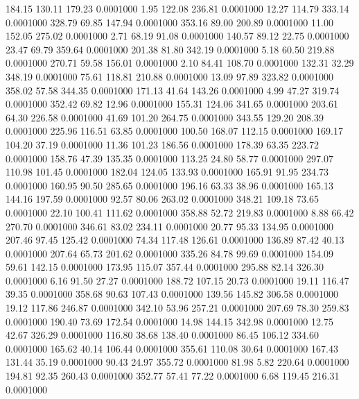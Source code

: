  184.15  130.11  179.23   0.0001000
   1.95  122.08  236.81   0.0001000
  12.27  114.79  333.14   0.0001000
 328.79   69.85  147.94   0.0001000
 353.16   89.00  200.89   0.0001000
  11.00  152.05  275.02   0.0001000
   2.71   68.19   91.08   0.0001000
 140.57   89.12   22.75   0.0001000
  23.47   69.79  359.64   0.0001000
 201.38   81.80  342.19   0.0001000
   5.18   60.50  219.88   0.0001000
 270.71   59.58  156.01   0.0001000
   2.10   84.41  108.70   0.0001000
 132.31   32.29  348.19   0.0001000
  75.61  118.81  210.88   0.0001000
  13.09   97.89  323.82   0.0001000
 358.02   57.58  344.35   0.0001000
 171.13   41.64  143.26   0.0001000
   4.99   47.27  319.74   0.0001000
 352.42   69.82   12.96   0.0001000
 155.31  124.06  341.65   0.0001000
 203.61   64.30  226.58   0.0001000
  41.69  101.20  264.75   0.0001000
 343.55  129.20  208.39   0.0001000
 225.96  116.51   63.85   0.0001000
 100.50  168.07  112.15   0.0001000
 169.17  104.20   37.19   0.0001000
  11.36  101.23  186.56   0.0001000
 178.39   63.35  223.72   0.0001000
 158.76   47.39  135.35   0.0001000
 113.25   24.80   58.77   0.0001000
 297.07  110.98  101.45   0.0001000
 182.04  124.05  133.93   0.0001000
 165.91   91.95  234.73   0.0001000
 160.95   90.50  285.65   0.0001000
 196.16   63.33   38.96   0.0001000
 165.13  144.16  197.59   0.0001000
  92.57   80.06  263.02   0.0001000
 348.21  109.18   73.65   0.0001000
  22.10  100.41  111.62   0.0001000
 358.88   52.72  219.83   0.0001000
   8.88   66.42  270.70   0.0001000
 346.61   83.02  234.11   0.0001000
  20.77   95.33  134.95   0.0001000
 207.46   97.45  125.42   0.0001000
  74.34  117.48  126.61   0.0001000
 136.89   87.42   40.13   0.0001000
 207.64   65.73  201.62   0.0001000
 335.26   84.78   99.69   0.0001000
 154.09   59.61  142.15   0.0001000
 173.95  115.07  357.44   0.0001000
 295.88   82.14  326.30   0.0001000
   6.16   91.50   27.27   0.0001000
 188.72  107.15   20.73   0.0001000
  19.11  116.47   39.35   0.0001000
 358.68   90.63  107.43   0.0001000
 139.56  145.82  306.58   0.0001000
  19.12  117.86  246.87   0.0001000
 342.10   53.96  257.21   0.0001000
 207.69   78.30  259.83   0.0001000
 190.40   73.69  172.54   0.0001000
  14.98  144.15  342.98   0.0001000
  12.75   42.67  326.29   0.0001000
 116.80   38.68  138.40   0.0001000
  86.45  106.12  334.60   0.0001000
 165.62   40.14  106.44   0.0001000
 355.61  110.08   30.64   0.0001000
 167.43  131.44   35.19   0.0001000
  90.43   24.97  355.72   0.0001000
  81.98    5.82  220.64   0.0001000
 194.81   92.35  260.43   0.0001000
 352.77   57.41   77.22   0.0001000
   6.68  119.45  216.31   0.0001000
